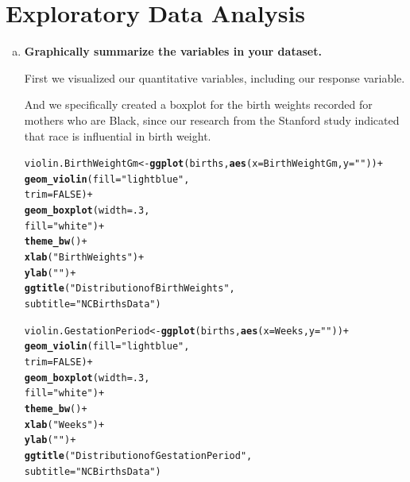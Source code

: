 \documentclass{article}\usepackage[]{graphicx}\usepackage[]{xcolor}
\makeatletter
\newcommand{\hlnum}[1]{\textcolor[rgb]{0.686,0.059,0.569}{#1}}%
\newcommand{\hlstr}[1]{\textcolor[rgb]{0.192,0.494,0.8}{#1}}%
\newcommand{\hlopt}[1]{\textcolor[rgb]{0,0,0}{#1}}%
\newcommand{\hlstd}[1]{\textcolor[rgb]{0.345,0.345,0.345}{#1}}%
\newcommand{\hlkwb}[1]{\textcolor[rgb]{0.69,0.353,0.396}{#1}}%
\newcommand{\hlkwc}[1]{\textcolor[rgb]{0.333,0.667,0.333}{#1}}%
\newcommand{\hlkwd}[1]{\textcolor[rgb]{0.737,0.353,0.396}{\textbf{#1}}}%
\newenvironment{kframe}{%
 \def\at@end@of@kframe{}%
 \ifinner\ifhmode%
  \def\at@end@of@kframe{\end{minipage}}%
  \begin{minipage}{\columnwidth}%
 \fi\fi%
 \def\FrameCommand##1{\hskip\@totalleftmargin \hskip-\fboxsep
 \colorbox{shadecolor}{##1}\hskip-\fboxsep
     \hskip-\linewidth \hskip-\@totalleftmargin \hskip\columnwidth}%
 \MakeFramed {\advance\hsize-\width
   \@totalleftmargin\z@ \linewidth\hsize
   \@setminipage}}%
 {\par\unskip\endMakeFramed%
 \at@end@of@kframe}
\newenvironment{knitrout}{}{} %
\makeatother
\begin{document}
\section{Exploratory Data Analysis}
\begin{enumerate}[a.]
\item\textbf{Graphically summarize the variables in your dataset.}

First we visualized our quantitative variables, including our response variable. 

And we specifically created a boxplot for the birth weights recorded for mothers who are Black, since our research from the Stanford study indicated that race is influential in birth weight.

\begin{knitrout}
\color{fgcolor}\begin{kframe}
\begin{alltt}
\hlstd{violin.BirthWeightGm} \hlkwb{<-} \hlkwd{ggplot}\hlstd{(births,} \hlkwd{aes}\hlstd{(}\hlkwc{x}\hlstd{=BirthWeightGm,} \hlkwc{y}\hlstd{=}\hlstr{""}\hlstd{))}\hlopt{+}
  \hlkwd{geom_violin}\hlstd{(}\hlkwc{fill} \hlstd{=} \hlstr{"lightblue"}\hlstd{,}
              \hlkwc{trim} \hlstd{=} \hlnum{FALSE}\hlstd{)}\hlopt{+}
  \hlkwd{geom_boxplot}\hlstd{(}\hlkwc{width} \hlstd{=} \hlnum{.3}\hlstd{,}
               \hlkwc{fill} \hlstd{=} \hlstr{"white"}\hlstd{)} \hlopt{+}
  \hlkwd{theme_bw}\hlstd{()}\hlopt{+}
  \hlkwd{xlab}\hlstd{(}\hlstr{"Birth Weights"}\hlstd{)}\hlopt{+}
  \hlkwd{ylab}\hlstd{(}\hlstr{" "}\hlstd{)}\hlopt{+}
  \hlkwd{ggtitle}\hlstd{(}\hlstr{"Distribution of Birth Weights"}\hlstd{,}
          \hlkwc{subtitle} \hlstd{=} \hlstr{"NCBirths Data"}\hlstd{)}


\hlstd{violin.GestationPeriod} \hlkwb{<-} \hlkwd{ggplot}\hlstd{(births,} \hlkwd{aes}\hlstd{(}\hlkwc{x}\hlstd{=Weeks,} \hlkwc{y}\hlstd{=}\hlstr{""}\hlstd{))}\hlopt{+}
  \hlkwd{geom_violin}\hlstd{(}\hlkwc{fill} \hlstd{=} \hlstr{"lightblue"}\hlstd{,}
              \hlkwc{trim} \hlstd{=} \hlnum{FALSE}\hlstd{)}\hlopt{+}
  \hlkwd{geom_boxplot}\hlstd{(}\hlkwc{width} \hlstd{=} \hlnum{.3}\hlstd{,}
               \hlkwc{fill} \hlstd{=} \hlstr{"white"}\hlstd{)} \hlopt{+}
  \hlkwd{theme_bw}\hlstd{()}\hlopt{+}
  \hlkwd{xlab}\hlstd{(}\hlstr{"Weeks"}\hlstd{)}\hlopt{+}
  \hlkwd{ylab}\hlstd{(}\hlstr{" "}\hlstd{)}\hlopt{+}
  \hlkwd{ggtitle}\hlstd{(}\hlstr{"Distribution of Gestation Period"}\hlstd{,}
          \hlkwc{subtitle} \hlstd{=} \hlstr{"NCBirths Data"}\hlstd{)}



\end{alltt}
\end{kframe}
\end{knitrout}
\end{enumerate}
\end{document}
